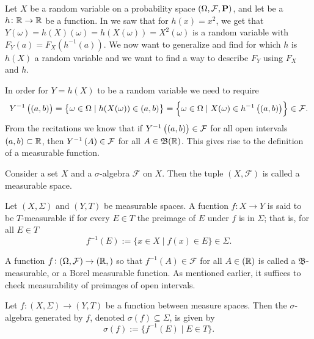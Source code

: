 \documentclass[11pt,a4paper]{article}
\begin{document}
\begin{remark}
  Let $X$ be a random variable on a probability space
  $(\Omega, \mathcal F, \mathbf{P})$,
  and let be a $h \colon \mathbb{R} \to \mathbb{R}$ be a function.
  In  we saw that for $h(x) = x^2$,
  we get that $Y(\omega) = h(X)(\omega) = h(X(\omega)) = X^2(\omega)$
  is a random variable with $F_Y(a) = F_X(h^{-1}(a))$.
  We now want to generalize and find for which $h$ is $h(X)$ a random
  variable and we want to find a way to describe $F_Y$ using $F_X$ and $h$.

  In order for $Y = h(X)$ to be a random variable we need to require
  \[
    Y^{-1}\del{(a,b)} =
    \set{\omega \in \Omega \mid h(X(\omega)) \in (a,b)} =
    \set{\omega \in \Omega \mid X(\omega) \in h^{-1}\del{(a,b)}} \in \mathcal F.
  \]
  From the recitations we know that if $Y^{-1}\del{(a,b)} \in \mathcal F$
  for all open intervals $(a,b) \subset \mathbb{R}$,
  then $Y^{-1}\del{A} \in \mathcal F$ for all $A \in \mathfrak B(\mathbb{R})$.
  This gives rise to the definition of a measurable function.
\end{remark}

\begin{definition}
  Consider a set $X$ and a $\sigma$-algebra $\mathcal F$ on $X$.
  Then the tuple $(X,{\mathcal {F}})$ is called a measurable space.
\end{definition}
\begin{definition}
  Let $(X, \Sigma)$ and $(Y, T)$ be measurable spaces. A fucntion
  $f \colon X \to Y$ is said to be $T$-measurable if for every $E \in T$
  the preimage of $E$ under $f$ is in $\Sigma$; that is, for all 
  $E \in T$
  \[
    f^{-1}(E):=\{x\in X\mid f(x)\in E\}\in \Sigma.
  \]
\end{definition}

\begin{example}
  A function $f \colon (\Omega, \mathcal F) \to (\mathbb{R}, \mathfrak)$ so that
  $f^{-1}(A) \in \mathcal F$ for all $A \in \mathfrak(\mathbb{R})$ is called
  a $\mathfrak B$-measurable, or a Borel measurable function.
  As mentioned earlier, it suffices to check measurability of preimages
  of open intervals.
\end{example}

\begin{definition}
  Let $f \colon (X, \Sigma) \to (Y, T)$ be a function between
  measure spaces.
  Then the $\sigma$-algebra generated by $f$,
  denoted $\sigma(f) \subseteq \Sigma$, is given by
  \[
    \sigma(f) := \{f^{-1}(E) \mid E \in T\}.
  \]
\end{definition}
\end{document}
